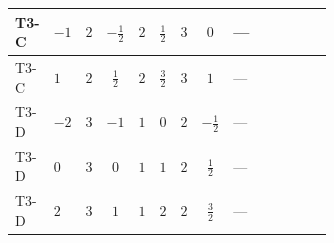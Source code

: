 \documentclass[8pt]{article}
\begin{document}
\begin{landscape}
\begin{longtable}{@{}llcccccc >{\raggedright\arraybackslash}p{0.21\linewidth} >{\raggedright\arraybackslash}p{0.21\linewidth} >{\raggedright\arraybackslash}p{0.21\linewidth}@{}}
\midrule
T3-C & $-1$ & $2$ & $-\frac{1}{2}$ & $2$ & $\frac{1}{2}$ & $3$ & $0$ & --- & \scriptsize\adjustbox{max width=\linewidth}{$\begin{gathered} -\frac{33}{4} {g_2}^2 \left({y_1}\right)_{ij}\end{gathered}$} & \scriptsize\adjustbox{max width=\linewidth}{$\begin{gathered} -\frac{3}{4} {g_1}^2 \left({y_1}\right)_{ij}\end{gathered}$} \\
\midrule
T3-C & $1$ & $2$ & $\frac{1}{2}$ & $2$ & $\frac{3}{2}$ & $3$ & $1$ & --- & \scriptsize\adjustbox{max width=\linewidth}{$\begin{gathered} -\frac{33}{4} {g_2}^2 \left({y_1}\right)_{ij}\end{gathered}$} & \scriptsize\adjustbox{max width=\linewidth}{$\begin{gathered} -\frac{15}{4} {g_1}^2 \left({y_1}\right)_{ij}\end{gathered}$} \\
\midrule
T3-D & $-2$ & $3$ & $-1$ & $1$ & $0$ & $2$ & $-\frac{1}{2}$ & --- & \scriptsize\adjustbox{max width=\linewidth}{$\begin{gathered} -\frac{9}{2} {g_2}^2 \left({y_1}\right)_{ij}\end{gathered}$} & \scriptsize\adjustbox{max width=\linewidth}{$\begin{gathered} -\frac{3}{2} {g_1}^2 \left({y_1}\right)_{ij}\end{gathered}$} \\
\midrule
T3-D & $0$ & $3$ & $0$ & $1$ & $1$ & $2$ & $\frac{1}{2}$ & --- & \scriptsize\adjustbox{max width=\linewidth}{$\begin{gathered} -\frac{9}{2} {g_2}^2 \left({y_1}\right)_{ij}\end{gathered}$} & \scriptsize\adjustbox{max width=\linewidth}{$\begin{gathered} -\frac{3}{2} {g_1}^2 \left({y_1}\right)_{ij}\end{gathered}$} \\
\midrule
T3-D & $2$ & $3$ & $1$ & $1$ & $2$ & $2$ & $\frac{3}{2}$ & --- & \scriptsize\adjustbox{max width=\linewidth}{$\begin{gathered} -\frac{9}{2} {g_2}^2 \left({y_1}\right)_{ij}\end{gathered}$} & \scriptsize\adjustbox{max width=\linewidth}{$\begin{gathered} -\frac{15}{2} {g_1}^2 \left({y_1}\right)_{ij}\end{gathered}$} \\

\end{longtable}
\end{landscape}
\end{document}
